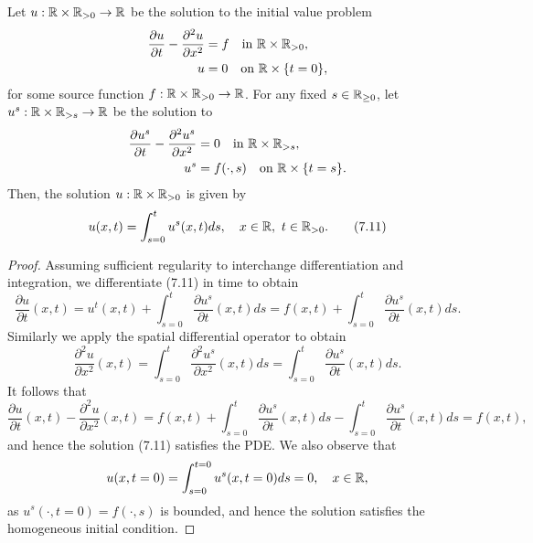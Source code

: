 \begin{theorem}
    Let $u : \mathbb{R} \times \mathbb{R}_{>0} \to \mathbb{R}$ be the solution to the initial value problem
    \begin{align*}
        \frac{\partial u}{\partial t} - \frac{\partial^2 u}{\partial x^2} &= f \quad \text{in } \mathbb{R} \times \mathbb{R}_{>0}, \\
        u &= 0 \quad \text{on } \mathbb{R} \times \{t = 0\},
    \end{align*}
    for some source function $f : \mathbb{R} \times \mathbb{R}_{>0} \to \mathbb{R}$. For any fixed $s \in \mathbb{R}_{\geq 0}$, let $u^s : \mathbb{R} \times \mathbb{R}_{>s} \to \mathbb{R}$ be the solution to
    \begin{align*}
        \frac{\partial u^s}{\partial t} - \frac{\partial^2 u^s}{\partial x^2} &= 0 \quad \text{in } \mathbb{R} \times \mathbb{R}_{>s}, \\
        u^s &= f(\cdot, s) \quad \text{on } \mathbb{R} \times \{t = s\}.
    \end{align*}
    Then, the solution $u : \mathbb{R} \times \mathbb{R}_{>0}$ is given by
    \begin{equation*}
        u(x, t) = \int_{s=0}^{t} u^s(x, t) ds, \quad x \in \mathbb{R}, \ t \in \mathbb{R}_{>0}. \tag{7.11}
    \end{equation*}
\end{theorem}
\begin{proof}
    Assuming sufficient regularity to interchange differentiation and integration, we differentiate (7.11) in time to obtain
    \[\frac{\partial u}{\partial t}(x, t) = u^t(x, t) + \int_{s=0}^{t} \frac{\partial u^s}{\partial t}(x, t) ds = f(x, t) + \int_{s=0}^{t} \frac{\partial u^s}{\partial t}(x, t) ds.\]
    Similarly we apply the spatial differential operator to obtain
    \[\frac{\partial^2 u}{\partial x^2}(x, t) = \int_{s=0}^{t} \frac{\partial^2 u^s}{\partial x^2}(x, t) ds = \int_{s=0}^{t} \frac{\partial u^s}{\partial t}(x, t) ds.\]
    It follows that
    \[\frac{\partial u}{\partial t}(x, t) - \frac{\partial^2 u}{\partial x^2}(x, t) = f(x, t) + \int_{s=0}^{t} \frac{\partial u^s}{\partial t}(x, t) ds - \int_{s=0}^{t} \frac{\partial u^s}{\partial t}(x, t) ds = f(x, t),\]
    and hence the solution (7.11) satisfies the PDE. We also observe that
    \[u(x, t = 0) = \int_{s=0}^{t=0} u^s(x, t = 0) ds = 0, \quad x \in \mathbb{R},\]
    as $u^s(\cdot, t = 0) = f(\cdot, s)$ is bounded, and hence the solution satisfies the homogeneous initial condition.
\end{proof}

